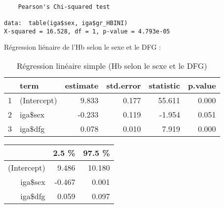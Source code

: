 \documentclass[11pt,a4paper]{article}\usepackage[]{graphicx}\usepackage[]{color}
\makeatletter
\newenvironment{kframe}{%
 \def\at@end@of@kframe{}%
 \ifinner\ifhmode%
  \def\at@end@of@kframe{\end{minipage}}%
  \begin{minipage}{\columnwidth}%
 \fi\fi%
 \def\FrameCommand##1{\hskip\@totalleftmargin \hskip-\fboxsep
 \colorbox{shadecolor}{##1}\hskip-\fboxsep
     \hskip-\linewidth \hskip-\@totalleftmargin \hskip\columnwidth}%
 \MakeFramed {\advance\hsize-\width
   \@totalleftmargin\z@ \linewidth\hsize
   \@setminipage}}%
 {\par\unskip\endMakeFramed%
 \at@end@of@kframe}
\newenvironment{knitrout}{}{} %
\makeatother
\begin{document}
\begin{knitrout}
\color{fgcolor}\begin{kframe}
\begin{verbatim}

	Pearson's Chi-squared test

data:  table(iga$sex, iga$gr_HBINI)
X-squared = 16.528, df = 1, p-value = 4.793e-05
\end{verbatim}
\end{kframe}
\end{knitrout}

Régression liénaire de l'Hb selon le sexe et le DFG :
\begin{table}[H]
\centering
\begin{tabular}{rlrrrr}
  \hline
 & term & estimate & std.error & statistic & p.value \\ 
  \hline
1 & (Intercept) & 9.833 & 0.177 & 55.611 & 0.000 \\ 
  2 & iga\$sex & -0.233 & 0.119 & -1.954 & 0.051 \\ 
  3 & iga\$dfg & 0.078 & 0.010 & 7.919 & 0.000 \\ 
   \hline
\end{tabular}
\caption{Régression linéaire simple (Hb selon le sexe et le DFG)} 
\end{table}
\begin{table}[ht]
\centering
\begin{tabular}{rrr}
  \hline
 & 2.5 \% & 97.5 \% \\ 
  \hline
(Intercept) & 9.486 & 10.180 \\ 
  iga\$sex & -0.467 & 0.001 \\ 
  iga\$dfg & 0.059 & 0.097 \\ 
   \hline
\end{tabular}
\end{table}
\end{document}
